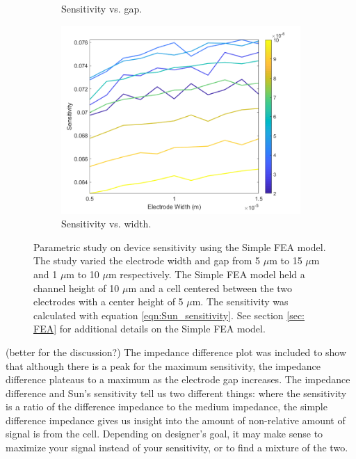 \begin{figure}[h]
\begin{subfigure}[t]{0.49\textwidth}
        \caption{Sensitivity vs. gap.}
    \end{subfigure}
    \hfill
    \begin{subfigure}[t]{0.49\textwidth}
        \centering
        \includegraphics[width=\textwidth]{images/comsol_simple_widthXsensitivity.png}
        \caption{Sensitivity vs. width.}
    \end{subfigure}
    \caption[Simple FEA model sensitivity]{Parametric study on device sensitivity using the Simple FEA model. The study varied the electrode width and gap from 5 $\mu$m to 15 $\mu$m and 1 $\mu$m to 10 $\mu$m respectively. The Simple FEA model held a channel height of 10 $\mu$m and a cell centered between the two electrodes with a center height of 5 $\mu$m. The sensitivity was calculated with equation \ref{eqn:Sun_sensitivity}. See section \ref{sec: FEA} for additional details on the Simple FEA model.} 
    \label{fig:simple_sensitivity}
\end{figure}

\par (better for the discussion?) The impedance difference plot was included to show that although there is a peak for the maximum sensitivity, the impedance difference plateaus to a maximum as the electrode gap increases. The impedance difference and Sun's sensitivity tell us two different things: where the sensitivity is a ratio of the difference impedance to the medium impedance, the simple difference impedance gives us insight into the amount of non-relative amount of signal is from the cell. Depending on designer's goal, it may make sense to maximize your signal instead of your sensitivity, or to find a mixture of the two. 

